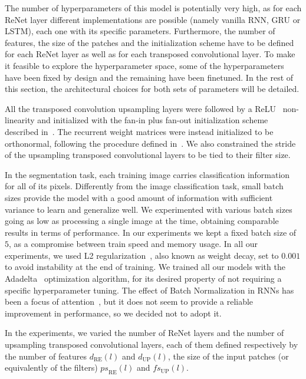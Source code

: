 The number of hyperparameters of this model is potentially very high, as for
each ReNet layer different implementations are possible (namely vanilla RNN,
GRU or LSTM), each one with its specific parameters. Furthermore, the number of
features, the size of the patches and the initialization scheme have to be
defined for each ReNet layer as well as for each transposed convolutional
layer. To make it feasible to explore the hyperparameter space, some of the
hyperparameters have been fixed by design and the remaining have been finetuned.
In the rest of this section, the architectural choices for both sets of
parameters will be detailed.

All the transposed convolution upsampling layers were followed by a
ReLU~\cite{Krizhevsky2012-alexnet} non-linearity and initialized with the
fan-in plus fan-out initialization scheme described
in~\cite{glorot2010understanding}. The recurrent weight matrices were instead
initialized to be orthonormal, following the procedure defined
in~\cite{Saxe2014}. We also constrained the stride of the upsampling transposed
convolutional layers to be tied to their filter size.

In the segmentation task, each training image carries classification
information for all of its pixels. Differently from the image classification
task, small batch sizes provide the model with a good amount of information
with sufficient variance to learn and generalize well. We experimented with
various batch sizes going as low as processing a single image at the time,
obtaining comparable results in terms of performance. In our experiments we
kept a fixed batch size of $5$, as a compromise between train speed and memory
usage. In all our experiments, we used L2
regularization~\cite{Krogh92asimple}, also known as weight decay, set to
$0.001$ to avoid instability at the end of training. We trained all our models
with the Adadelta~\cite{Zeiler-2012} optimization algorithm, for its desired
property of not requiring a specific hyperparameter tuning. The effect of Batch
Normalization in RNNs has been a focus of attention~\cite{Laurent2015}, but it
does not seem to provide a reliable improvement in performance, so we decided
not to adopt it.

In the experiments, we varied the number of ReNet layers and the number of
upsampling transposed convolutional layers, each of them defined respectively
by the number of features $d_{\text{RE}}(l)$ and $d_{\text{UP}}(l)$,
the size of the input patches (or equivalently of the filters)
${ps}_{\text{RE}}(l)$ and ${fs}_{\text{UP}}(l)$.

